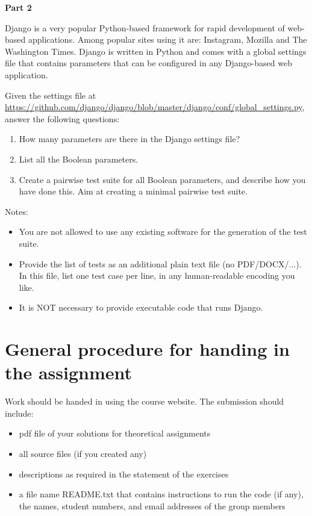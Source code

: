 \documentclass{pracs}
\begin{document}
\textbf{Part 2}

Django is a very popular Python-based framework for rapid development of web-based applications. Among popular sites using it are: Instagram, Mozilla and The Washington Times. Django is written in Python and comes with a global settings file that contains parameters that can be configured in any Django-based web application. 

Given the settings file at \url{https://github.com/django/django/blob/master/django/conf/global_settings.py}, answer the following questions:

\begin{enumerate}
\item How many parameters are there in the Django settings file?
\item List all the Boolean parameters.
\item Create a pairwise test suite for all Boolean parameters, and describe how you have done this. Aim at creating a minimal pairwise test suite. 
\end{enumerate}

Notes:
\begin{itemize}
\item You are not allowed to use any existing software for the generation of the test suite.
\item Provide the list of tests as an additional plain text file (no PDF/DOCX/...). In this file, list one test case per line, in any human-readable encoding you like.
\item It is NOT necessary to provide executable code that runs Django.
\end{itemize}







\section{General procedure for handing in the assignment}
Work should be handed in using the course website. The submission should include:
\begin{itemize}
\item pdf file of your solutions for theoretical assignments
\item all source files (if you created any)
\item descriptions as required in the statement of the exercises
\item a file name README.txt that contains instructions to run the code (if any), the names, student numbers, and email addresses of the group members
\end{itemize}
\end{document}
